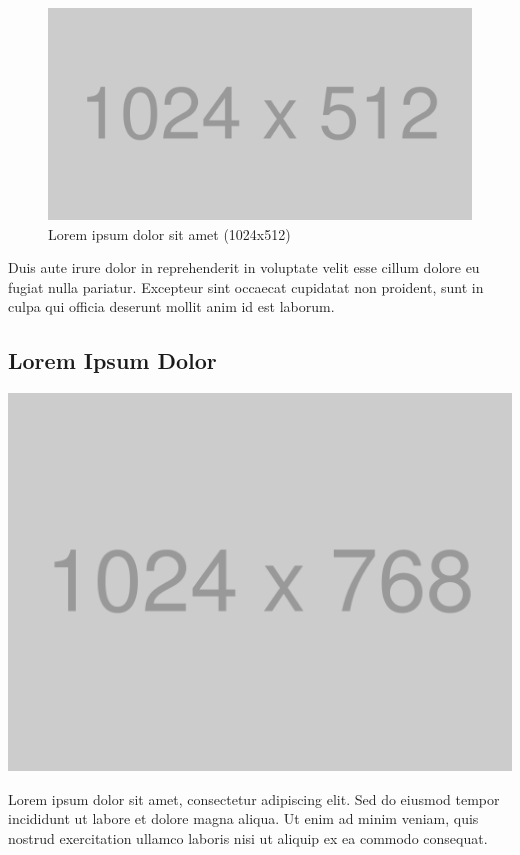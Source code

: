 \begin{figure}[h]
	\centering
	\includegraphics[width=1\linewidth]{graphics/1024x512.png}
	\caption{Lorem ipsum dolor sit amet (1024x512)}
	\label{fig:medium_image}
\end{figure}

Duis aute irure dolor in reprehenderit in voluptate velit esse cillum dolore eu fugiat nulla pariatur. Excepteur sint occaecat cupidatat non proident, sunt in culpa qui officia deserunt mollit anim id est laborum.

\subsection*{Lorem Ipsum Dolor}


	\includegraphics[width=\linewidth]{graphics/1024x768.png}


Lorem ipsum dolor sit amet, consectetur adipiscing elit. Sed do eiusmod tempor incididunt ut labore et dolore magna aliqua. Ut enim ad minim veniam, quis nostrud exercitation ullamco laboris nisi ut aliquip ex ea commodo consequat. 

